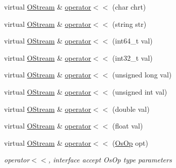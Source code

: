 \begin{DoxyCompactItemize}
virtual \hyperlink{classHSF_1_1OStream}{OStream} \& \hyperlink{classHSF_1_1OStream_ad542e8e0a3da490c9df517819fe174ca}{operator$<$$<$} (char chrt)
\item 
virtual \hyperlink{classHSF_1_1OStream}{OStream} \& \hyperlink{classHSF_1_1OStream_a1e3204a3bf16caf916d3e18c562a709c}{operator$<$$<$} (string str)
\item 
virtual \hyperlink{classHSF_1_1OStream}{OStream} \& \hyperlink{classHSF_1_1OStream_a771b87dab59786db30cf1d5eb5473e64}{operator$<$$<$} (int64\_\-t val)
\item 
virtual \hyperlink{classHSF_1_1OStream}{OStream} \& \hyperlink{classHSF_1_1OStream_a1bbf47f6f3c68938fb4c1006b878aa60}{operator$<$$<$} (int32\_\-t val)
\item 
virtual \hyperlink{classHSF_1_1OStream}{OStream} \& \hyperlink{classHSF_1_1OStream_ae4edb4f375ace6dab22021629c29a24f}{operator$<$$<$} (unsigned long val)
\item 
virtual \hyperlink{classHSF_1_1OStream}{OStream} \& \hyperlink{classHSF_1_1OStream_aa0cd93dd86633a0603d09d35e20c9520}{operator$<$$<$} (unsigned int val)
\item 
virtual \hyperlink{classHSF_1_1OStream}{OStream} \& \hyperlink{classHSF_1_1OStream_a8c3d22e78a10c990e136c1514dfc99c6}{operator$<$$<$} (double val)
\item 
virtual \hyperlink{classHSF_1_1OStream}{OStream} \& \hyperlink{classHSF_1_1OStream_a26a658cc9ab9422d58252ef75a7ca360}{operator$<$$<$} (float val)
\item 
virtual \hyperlink{classHSF_1_1OStream}{OStream} \& \hyperlink{classHSF_1_1OStream_aa7a6f8ac15aaa2145e23f92904350b39}{operator$<$$<$} (\hyperlink{namespaceHSF_a5c97750573f23c09a9fed0efa5baa52d}{OsOp} opt)
\begin{DoxyCompactList}\small\item\em operator$<$$<$, interface accept OsOp type parameters \item\end{DoxyCompactList}\end{DoxyCompactItemize}


